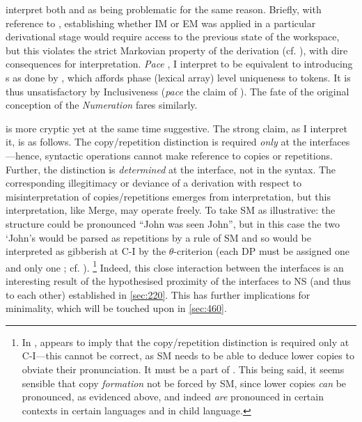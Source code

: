 \textcite{CollinsC.GroatEM_2018} interpret both  and  as being problematic for the same reason. Briefly, with reference to , establishing whether IM or EM was applied in a particular derivational stage would require access to the previous state of the workspace, but this violates the strict Markovian property of the derivation (cf. ), with dire consequences for interpretation. \textit{Pace} \textcite{CollinsC.GroatEM_2018}, I interpret  to be equivalent to introducing \LIk s as done by \CS, which affords phase (lexical array) level uniqueness to tokens. It is thus unsatisfactory by Inclusiveness (\textit{pace} the claim of ). The fate of the original conception of the \textit{Numeration} \parencite{ChomskyN_1995} fares similarly.

 is more cryptic yet at the same time suggestive. The strong claim, as I interpret it, is as follows. The copy/repetition distinction is required \textit{only} at the interfaces---hence, syntactic operations cannot make reference to copies or repetitions. Further, the distinction is \textit{determined} at the interface, not in the syntax. The corresponding illegitimacy or deviance of a derivation with respect to misinterpretation of copies/repetitions emerges from interpretation, but this interpretation, like Merge, may operate freely. To take SM as illustrative: the structure  could be pronounced ``John was seen John'', but in this case the two `John's would be parsed as repetitions by a rule of SM and so would be interpreted as gibberish at C-I by the $\theta$-criterion (each DP must be assigned one and only one \thetarole; cf. ).%
\footnote{In , \textcite{ChomskyN_2021} appears to imply that the copy/repetition distinction is required only at C-I---this cannot be correct, as SM needs to be able to deduce lower copies to obviate their pronunciation. It must be a part of \Transfer. This being said, it seems sensible that copy \emph{formation} not be forced by SM, since lower copies \emph{can} be pronounced, as evidenced above, and indeed \emph{are} pronounced in certain contexts in certain languages and in child language.}
Indeed, this close interaction between the interfaces is an interesting result of the hypothesised proximity of the interfaces to NS (and thus to each other) established in \autoref{sec:220}. This has further implications for minimality, which will be touched upon in \autoref{sec:460}.

